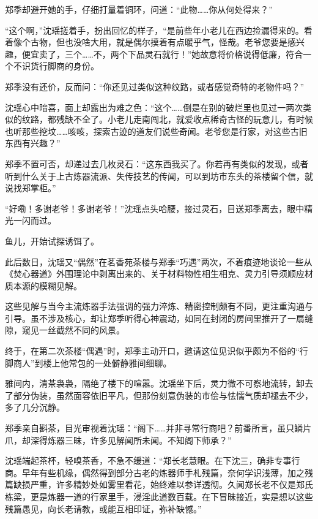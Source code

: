 郑季却避开她的手，仔细打量着铜环，问道：“此物……你从何处得来？”

“这个啊，”沈瑶搓着手，扮出回忆的样子，“是前些年小老儿在西边捡漏得来的。看着像个古物，但也没啥大用，就是偶尔摸着有点暖乎气，怪哉。老爷您要是感兴趣，便宜卖了，三个……不，两个下品灵石就行！”她故意将价格说得低廉，符合一个不识货行脚商的身份。

郑季没有还价，反而问：“你还见过类似这种纹路，或者感觉奇特的老物件吗？”

沈瑶心中暗喜，面上却露出为难之色：“这个……倒是在别的破烂里也见过一两次类似的纹路，都残缺不全了。小老儿走南闯北，就爱收点稀奇古怪的玩意儿，有时候也听那些挖坟……咳咳，探索古迹的道友们说些奇闻。老爷您是行家，对这些古旧东西有兴趣？”

郑季不置可否，却递过去几枚灵石：“这东西我买了。你若再有类似的发现，或者听到什么关于上古炼器流派、失传技艺的传闻，可以到坊市东头的茶楼留个信，就说找郑掌柜。”

“好嘞！多谢老爷！多谢老爷！”沈瑶点头哈腰，接过灵石，目送郑季离去，眼中精光一闪而过。

鱼儿，开始试探诱饵了。

\vspace{2em}

此后数日，沈瑶又“偶然”在茗香苑茶楼与郑季“巧遇”两次，不着痕迹地谈论一些从《焚心器道》外围理论中剥离出来的、关于材料物性相生相克、灵力引导须顺应材质本源的模糊见解。

这些见解与当今主流炼器手法强调的强力淬炼、精密控制颇有不同，更注重沟通与引导。虽不涉及核心，却让郑季听得心神震动，如同在封闭的房间里推开了一扇缝隙，窥见一丝截然不同的风景。

终于，在第二次茶楼“偶遇”时，郑季主动开口，邀请这位见识似乎颇为不俗的“行脚商人”到楼上他常包的一处僻静雅间细聊。

\vspace{2em}

雅间内，清茶袅袅，隔绝了楼下的喧嚣。沈瑶坐下后，灵力微不可察地流转，卸去了部分伪装，虽然面容依旧平凡，但那份刻意伪装的市侩与怯懦气质却褪去不少，多了几分沉静。

郑季亲自斟茶，目光审视着沈瑶：“阁下……并非寻常行商吧？前番所言，虽只鳞片爪，却深得炼器三昧，许多见解闻所未闻。不知阁下师承？”

沈瑶端起茶杯，轻嗅茶香，不急不缓道：“郑长老慧眼。在下沈三，确非专事行商。早年有些机缘，偶然得到部分古老的炼器师手札残篇，奈何学识浅薄，加之残篇缺损严重，许多精妙处如雾里看花，始终难以参详透彻。久闻郑长老不仅是郑氏栋梁，更是炼器一道的行家里手，浸淫此道数百载。在下冒昧接近，实是想以这些残篇愚见，向长老请教，或能互相印证，弥补缺憾。”

